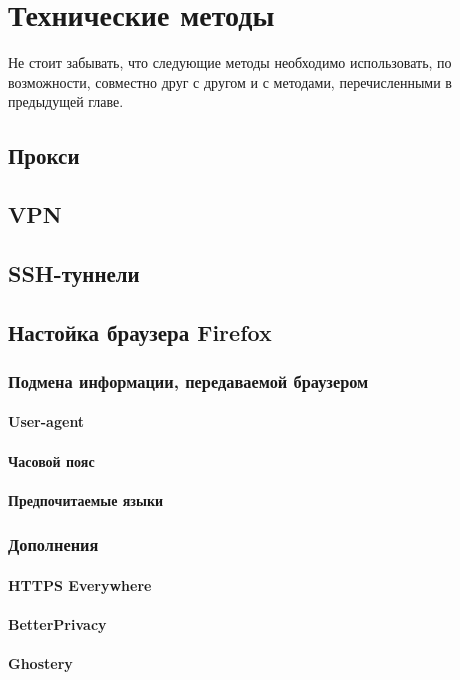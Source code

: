 \chapter{Технические методы}
Не стоит забывать, что следующие методы необходимо использовать, по возможности, совместно друг с другом и с методами, перечисленными в предыдущей главе.
\section{Прокси}

\section{VPN}

\section{SSH-туннели}

\section{Настойка браузера Firefox}
\subsection{Подмена информации, передаваемой браузером}
\subsubsection{User-agent}
\subsubsection{Часовой пояс}
\subsubsection{Предпочитаемые языки}
\subsection{Дополнения}
\subsubsection{HTTPS Everywhere}
\subsubsection{BetterPrivacy}
\subsubsection{Ghostery}

